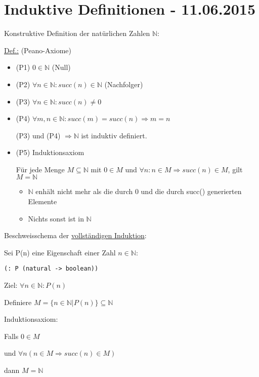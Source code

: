 \documentclass[a4paper, 20pt, openany]{book}
\begin{document}
\chapter{Induktive Definitionen - 11.06.2015}

Konstruktive Definition der natürlichen Zahlen $\mathbb{N}$:

\underline{Def.:} (Peano-Axiome)

\begin{itemize}
  \item (P1) $0 \in \mathbb{N}$ (Null)
  \item (P2) $\forall n \in \mathbb{N} : succ(n) \in \mathbb{N}$ (Nachfolger)
  \item (P3) $\forall n \in \mathbb{N} : succ(n) \neq 0$ 
  \item (P4) $\forall m,n \in \mathbb{N} : succ(m) = succ(n) \Rightarrow m=n$
  
  (P3) und (P4) $\Rightarrow \mathbb{N}$ ist induktiv definiert.
  
  \item (P5) Induktionsaxiom
  
  Für jede Menge $M \subseteq \mathbb{N}$ mit $0 \in M$ und $\forall n: n \in M \Rightarrow succ(n) \in M$, gilt $M = \mathbb{N}$
  
  \begin{itemize}
    \item $\mathbb{N}$ enhält nicht mehr als die durch 0 und die durch succ() generierten Elemente
    \item Nichts sonst ist in $\mathbb{N}$
  \end{itemize}
\end{itemize}

Beschweisschema der \underline{vollständigen Induktion}: 

Sei P(n) eine Eigenschaft einer Zahl $n \in \mathbb{N}$: 

\begin{lstlisting}
(: P (natural -> boolean))
\end{lstlisting}

Ziel: $\forall n \in \mathbb{N} : P(n)$

Definiere $M = \{n \in \mathbb{N} | P(n) \} \subseteq \mathbb{N}$

Induktionsaxiom:

Falls $0 \in M$

und $\forall n (n \in M \Rightarrow succ(n) \in M)$

dann $M = \mathbb{N}$
\end{document}
